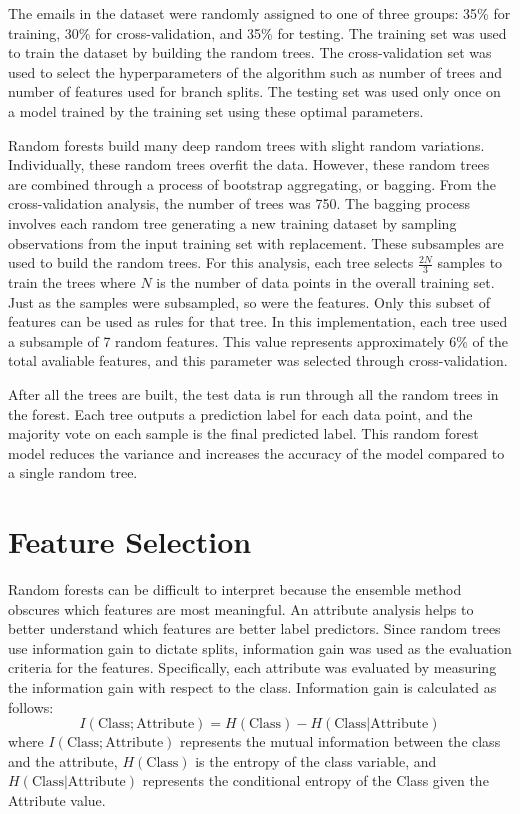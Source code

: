 \documentclass[12pt]{report}
\begin{document}
The emails in the dataset were randomly assigned to one of three groups: 35\% for training, 30\% for cross-validation, and 35\% for testing.
The training set was used to train the dataset by building the random trees.
The cross-validation set was used to select the hyperparameters of the algorithm such as number of trees and number of features used for branch splits.
The testing set was used only once on a model trained by the training set using these optimal parameters.

Random forests build many deep random trees with slight random variations.
Individually, these random trees overfit the data.
However, these random trees are combined through a process of bootstrap aggregating, or bagging.
From the cross-validation analysis, the number of trees was 750.
The bagging process involves each random tree generating a new training dataset by sampling observations from the input training set with replacement.
These subsamples are used to build the random trees.
For this analysis, each tree selects $\frac{2N}{3}$ samples to train the trees where $N$ is the number of data points in the overall training set.
Just as the samples were subsampled, so were the features.
Only this subset of features can be used as rules for that tree.
In this implementation, each tree used a subsample of 7 random features.
This value represents approximately 6\% of the total avaliable features, and this parameter was selected through cross-validation.

After all the trees are built, the test data is run through all the random trees in the forest.
Each tree outputs a prediction label for each data point, and the majority vote on each sample is the final predicted label.
This random forest model reduces the variance and increases the accuracy of the model compared to a single random tree.

\section{Feature Selection}
Random forests can be difficult to interpret because the ensemble method obscures which features are most meaningful.
An attribute analysis helps to better understand which features are better label predictors.
Since random trees use information gain to dictate splits, information gain was used as the evaluation criteria for the features.
Specifically, each attribute was evaluated by measuring the information gain with respect to the class.
Information gain is calculated as follows:
\begin{equation}
I(\text{Class}; \text{Attribute}) = H(\text{Class}) - H(\text{Class} | \text{Attribute})
\end{equation} \label{eq:info_gained}
where $I(\text{Class}; \text{Attribute})$ represents the mutual information between the class and the attribute, $H(\text{Class})$ is the entropy of the class variable, and  $H(\text{Class} | \text{Attribute})$ represents the conditional entropy of the Class given the Attribute value.  
\end{document}
